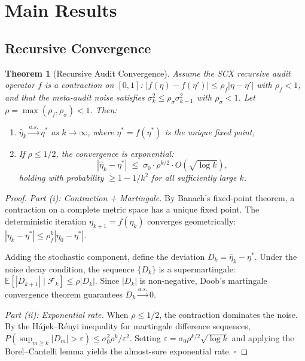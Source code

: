 \documentclass[12pt,a4paper]{article}
\newtheorem{theorem}{Theorem}[section]
\newcommand{\E}{\mathbb{E}}
\begin{document}
\section{Main Results}

\subsection{Recursive Convergence}

\begin{theorem}[Recursive Audit Convergence]
\label{thm:convergence}
Assume the SCX recursive audit operator $f$ is a contraction on $[0,1]$:
$|f(\eta)-f(\eta')|\leq\rho_f|\eta-\eta'|$ with $\rho_f<1$, and that the
meta-audit noise satisfies $\sigma_k^2\leq\rho_\sigma\sigma_{k-1}^2$ with
$\rho_\sigma<1$.  Let $\rho=\max(\rho_f,\rho_\sigma)<1$.  Then:
\begin{enumerate}[label=(\roman*)]
    \item $\hat{\eta}_k\xrightarrow{a.s.}\eta^*$ as $k\to\infty$, where
          $\eta^*=f(\eta^*)$ is the unique fixed point;
    \item If $\rho\leq1/2$, the convergence is exponential:
          \begin{equation}\label{eq:exp-convergence}
              |\hat{\eta}_k-\eta^*| \;\leq\;
              \sigma_0\cdot\rho^{k/2}\cdot O(\sqrt{\log k}),
          \end{equation}
          holding with probability $\geq1-1/k^2$ for all sufficiently large $k$.
\end{enumerate}
\end{theorem}

\begin{proof}
\textit{Part (i): Contraction + Martingale.}
By Banach's fixed-point theorem, a contraction on a complete metric space has
a unique fixed point.  The deterministic iteration $\eta_{k+1}=f(\eta_k)$
converges geometrically: $|\eta_k-\eta^*|\leq\rho_f^k|\eta_0-\eta^*|$.

Adding the stochastic component, define the deviation
$D_k = \hat{\eta}_k - \eta^*$.  Under the noise decay condition, the sequence
$\{D_k\}$ is a supermartingale:
$\E[|D_{k+1}|\mid\mathcal{F}_k] \leq \rho|D_k|$.
Since $|D_k|$ is non-negative, Doob's martingale convergence theorem guarantees
$D_k\xrightarrow{a.s.}0$.

\textit{Part (ii): Exponential rate.}
When $\rho\leq1/2$, the contraction dominates the noise.  By the
H\'ajek--R\'enyi inequality for martingale difference sequences,
$P(\sup_{m\geq k}|D_m|>\varepsilon) \leq \sigma_0^2\rho^k/\varepsilon^2$.
Setting $\varepsilon = \sigma_0\rho^{k/2}\sqrt{\log k}$ and applying the
Borel--Cantelli lemma yields the almost-sure exponential rate. $\square$
\end{proof}
\end{document}
